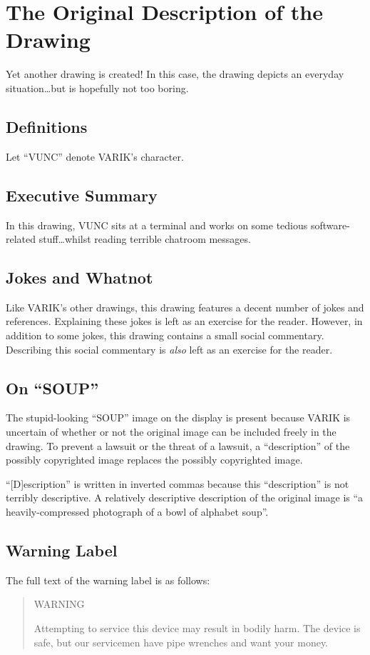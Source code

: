 \documentclass{report}
\begin{document}
\section{The Original Description of the Drawing}
Yet another drawing is created!
In this case, the drawing depicts an everyday situation\ldots but is hopefully not too boring.
\subsection{Definitions}
Let ``VUNC'' denote VARIK's character.
\subsection{Executive Summary}
In this drawing, VUNC sits at a terminal and works on some tedious software-related stuff\ldots whilst reading terrible chatroom messages.
\subsection{Jokes and Whatnot}
Like VARIK's other drawings, this drawing features a decent number of jokes and references.  Explaining these jokes is left as an exercise for the reader.
However, in addition to some jokes, this drawing contains a small social commentary.  Describing this social commentary is \textit{also} left as an exercise for the reader.
\subsection{On ``SOUP''}
The stupid-looking ``SOUP'' image on the display is present because VARIK is uncertain of whether or not the original image can be included freely in the drawing.  To prevent a lawsuit or the threat of a lawsuit, a ``description'' of the possibly copyrighted image replaces the possibly copyrighted image.

``[D]escription'' is written in inverted commas because this ``description'' is not terribly descriptive.  A relatively descriptive description of the original image is ``a heavily-compressed photograph of a bowl of alphabet soup''.
\subsection{Warning Label}
The full text of the warning label is as follows:
\begin{quote}
	WARNING

	Attempting to service this device may result in bodily harm.  The device is safe, but our servicemen have pipe wrenches and want your money.
\end{quote}
\end{document}

